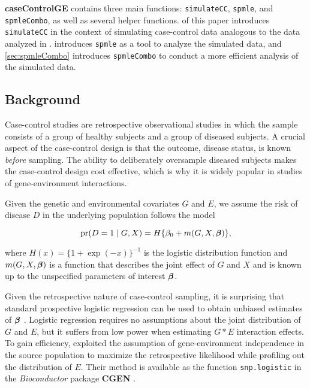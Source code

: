\documentclass[11pt,]{article}
\begin{document}
\textbf{caseControlGE} contains three main functions:
\texttt{simulateCC}, \texttt{spmle}, and \texttt{spmleCombo}, as well as
several helper functions.  of this paper introduces
\texttt{simulateCC} in the context of simulating case-control data
analogous to the data analyzed in \cite{Wang2018unpublished}.
 introduces \texttt{spmle} as a tool to analyze the
simulated data, and \cref{sec:spmleCombo} introduces \texttt{spmleCombo}
to conduct a more efficient analysis of the simulated data.

\subsection{Background}

Case-control studies are retrospective observational studies in which
the sample consists of a group of healthy subjects and a group of
diseased subjects. A crucial aspect of the case-control design is that
the outcome, disease status, is known \emph{before} sampling. The
ability to deliberately oversample diseased subjects makes the
case-control design cost effective, which is why it is widely popular in
studies of gene-environment interactions.

Given the genetic and environmental covariates \(G\) and \(E\), we
assume the risk of disease \(D\) in the underlying population follows
the model

\begin{equation}
  \hbox{pr}(D=1 \mid G,X) = H\{\beta_0 + m(G,X,\mbox{\boldmath $\beta$})\}, \label{eq:logisticRisk}
\end{equation}

where \(H(x)=\{ 1 + \exp(-x)\}^{-1}\) is the logistic distribution
function and \(m(G,X,\mbox{\boldmath $\beta$})\) is a function that describes the joint
effect of \(G\) and \(X\) and is known up to the unspecified parameters
of interest \(\mbox{\boldmath $\beta$}\).

Given the retrospective nature of case-control sampling, it is
surprising that standard prospective logistic regression can be used to
obtain unbiased estimates of \(\mbox{\boldmath $\beta$}\) \citep{PrenticePyke1979}.
Logistic regression requires no assumptions about the joint distribution
of \(G\) and \(E\), but it suffers from low power when estimating
\(G * E\) interaction effects. To gain efficiency,
\citet{ChatterjeeCarroll2005} exploited the assumption of
gene-environment independence in the source population to maximize the
retrospective likelihood while profiling out the distribution of \(E\).
Their method is available as the function \texttt{snp.logistic} in the
\emph{Bioconductor} package \textbf{CGEN} \citep{CGEN2012}.
\end{document}
